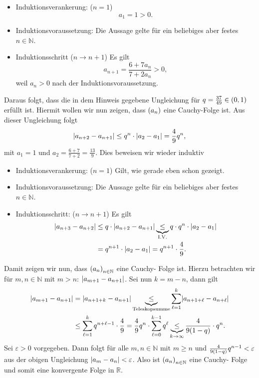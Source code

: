 \documentclass[german,12pt]{homework}
\newcommand{\NN}{\mathbb{N}}
\newcommand{\RR}{\mathbb{R}}
\DeclarePairedDelimiter{\absolute}{\lvert}{\rvert}
\DeclarePairedDelimiter{\enbrace}{(}{)}
\begin{document}
\begin{enumerate}
        \begin{itemize}
            \item Induktionsverankerung: (\(n = 1\))
            \[a_1 = 1 > 0.\]
            \item Induktionsvoraussetzung: Die Aussage gelte für ein beliebiges
            aber festes \(n \in \NN\).
            \item Induktionsschritt (\(n \to n + 1\)) Es gilt
            \[a_{n + 1} = \frac{6 + 7a_n}{7 + 2a_n} > 0,\]
            weil \(a_n > 0\) nach der Induktionsvoraussetzung.
        \end{itemize}
        Daraus folgt, dass die in dem Hinweis gegebene Ungleichung für \(q =
        \frac{37}{49} \in \enbrace{0, 1}\) erfüllt ist. Hiermit wollen wir nun
        zeigen, dass \(\enbrace*{a_n}\)  eine Cauchy-Folge ist. Aus dieser
        Ungleichung folgt
        \[\absolute*{a_{n + 2} - a_{n + 1}} \le q^n \cdot \absolute*{a_2 - a_1}
        = \frac{4}{9}q^n,\]
        mit \(a_1 = 1\) und \(a_2 = \frac{6 + 7}{7 + 2} = \frac{13}{9}\). Dies
        beweisen wir wieder induktiv
        \begin{itemize}
            \item Induktionsverankerung: (\(n = 1\)) Gilt, wie gerade eben
            schon gezeigt.
            \item Induktionsvoraussetzung: Die Aussage gelte für ein beliebiges
            aber festes \(n \in \NN\).
            \item Induktionsschritt: (\(n \to n + 1\)) Es gilt
            \begin{align*}
                \absolute*{a_{n + 3} - a_{n + 2}} &\le q \cdot \absolute*{a_{n
                + 2} - a_{n + 1}} \underbrace{\le}_\text{I.V.} q \cdot q^n
                \cdot \absolute*{a_2 - a_1}\\
                & = q^{n + 1} \cdot \absolute*{a_2 - a_1} = q^{n + 1} \cdot
                \frac{4}{9}.
            \end{align*}
        \end{itemize}
        Damit zeigen wir nun, dass \(\enbrace*{a_n}_{n \in \NN}\) eine Cauchy-
        Folge ist. Hierzu betrachten wir für \(m, n \in \NN\) mit \(m > n\):
        \(\absolute*{a_{m + 1} - a_{n + 1}}\). Sei nun \(k = m - n\), dann gilt
        \begin{align*}
            \absolute*{a_{m + 1} - a_{n + 1}} &= \absolute*{a_{n + 1 + k} -
            a_{n + 1}} \underbrace{\le}_\text{Teleskopsumme}\sum_{\ell =
            1}^k\absolute*{a_{n + 1 + \ell} - a_{n + \ell}}\\
            &\le \sum_{\ell = 1}^kq^{n + \ell - 1} \cdot \frac{4}{9} =
            \frac{4}{9}q^n \cdot \sum_{\ell = 0}^{k - 1}q^\ell
            \underbrace{\le}_{k \to \infty} \frac{4}{9\enbrace*{1 - q}} \cdot
            q^n.
        \end{align*}
        Sei \(\varepsilon > 0\) vorgegeben. Dann folgt für alle \(m, n \in
        \NN\) mit \(m \ge n\) und \(\frac{4}{9\enbrace*{1 - q}}q^{n - 1} <
        \varepsilon\) aus der obigen Ungleichung \(\absolute*{a_m - a_n} <
        \varepsilon\). Also ist \(\enbrace*{a_n}_{n \in \NN}\) eine Cauchy-
        Folge und somit eine konvergente Folge in \(\RR\).


\end{enumerate}
\end{document}
